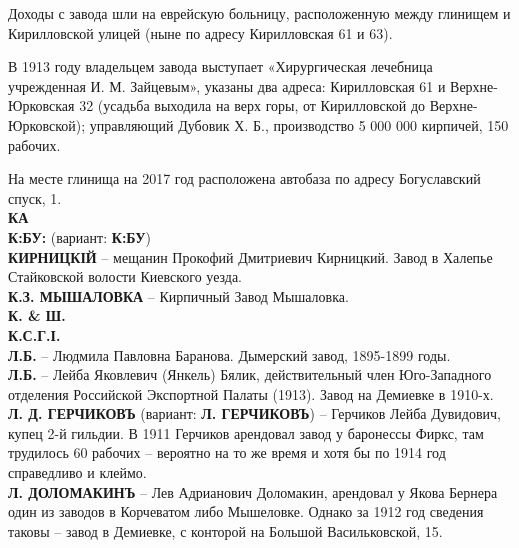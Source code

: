 Доходы с завода шли на еврейскую больницу, расположенную между глинищем и Кирилловской улицей (ныне по  адресу Кирилловская 61 и 63). 

В 1913 году владельцем завода выступает  «Хирургическая лечебница учрежденная И. М. Зайцевым», указаны два адреса: Кирилловская 61 и Верхне-Юрковская 32 (усадьба выходила на верх горы, от Кирилловской до Верхне-Юрковской); управляющий Дубовик Х. Б., производство 5 000 000 кирпичей, 150 рабочих.

На месте глинища на 2017 год расположена автобаза по адресу Богуславский спуск, 1.\\

\noindent\textbf{КА}\\

\noindent\textbf{К:БУ:} (вариант: \textbf{К:БУ})\\

\noindent\textbf{КИРНИЦКІЙ} – мещанин Прокофий Дмитриевич Кирницкий. Завод в Халепье Стайковской волости Киевского уезда.\\

\noindent\textbf{К.З. МЫШАЛОВКА} – Кирпичный Завод Мышаловка.\\

\noindent\textbf{К. \& Ш.}\\ 


\noindent\textbf{К.С.Г.І.}\\

\noindent\textbf{Л.Б.} – Людмила Павловна Баранова. Дымерский завод, 1895-1899 годы.\\

\noindent\textbf{Л.Б.} – Лейба Яковлевич (Янкель) Бялик, действительный член Юго-Западного отделения Российской Экспортной Палаты (1913). Завод на Демиевке в 1910-х.\\

\noindent\textbf{Л. Д. ГЕРЧИКОВЪ} (вариант: \textbf{Л. ГЕРЧИКОВЪ}) – Герчиков Лейба Дувидович, купец 2-й гильдии. В 1911 Герчиков арендовал завод у баронессы Фиркс, там трудилось 60 рабочих – вероятно на то же время и хотя бы по 1914 год справедливо и клеймо.\\

\noindent\textbf{Л. ДОЛОМАКИНЪ} – Лев Адрианович Доломакин, арендовал у Якова Бернера один из заводов в Корчеватом либо Мышеловке. Однако за 1912 год сведения таковы – завод в Демиевке, с конторой на Большой Васильковской, 15.\\

